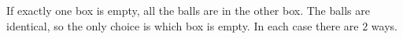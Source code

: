 If exactly one box is empty, all the balls are in the other box. The balls are identical, so the only choice is which box is empty. In each case there are $\boxed{2}$ ways.
